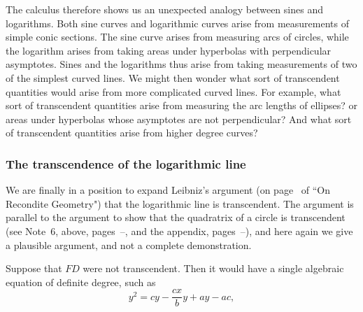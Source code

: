 \documentclass[polutonikogreek,english,twoside,openright]{article}
\begin{document}
The calculus therefore shows us an unexpected analogy between sines
and logarithms.  Both sine curves and logarithmic curves arise from
measurements of simple conic sections.  The sine curve arises from
measuring arcs of circles, while the logarithm arises from taking
areas under hyperbolas with perpendicular asymptotes.  Sines and the
logarithms thus arise from taking measurements of two of the simplest
curved lines.  We might then wonder what sort of transcendent
quantities would arise from more complicated curved lines.  For
example, what sort of transcendent quantities arise from measuring the
arc lengths of ellipses? or areas under hyperbolas whose asymptotes
are not perpendicular? And what sort of transcendent quantities arise
from higher degree curves?

\subsubsection*{The transcendence of the logarithmic line}

\label{blogtp}
We are finally in a position to expand Leibniz's argument (on page~\pageref{logtrans} of ``On Recondite Geometry") that the logarithmic line is transcendent.  The argument is parallel to the argument to show that the quadratrix of a circle is transcendent (see Note~6, above, pages~\pageref{begtc}--\pageref{endtc}, and the appendix, pages~\pageref{begapp}--\pageref{endapp}), and here again  we give a plausible argument, and not a complete demonstration.

Suppose that $FD$ were not transcendent.  Then it would have a single algebraic equation of definite degree, such as 
$$y^2 = cy - \frac{cx}{b}y + ay - ac,$$
\end{document}
